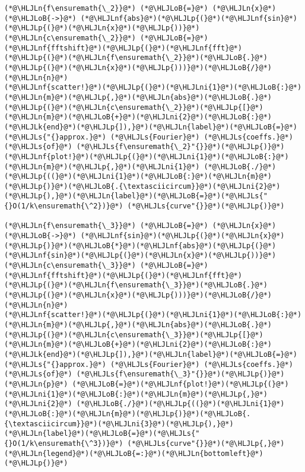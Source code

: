 \documentclass[12pt,a4paper]{article}
\newcommand{\HLJLk}[1]{\textcolor[RGB]{148,91,176}{\textbf{#1}}}
\newcommand{\HLJLn}[1]{#1}
\newcommand{\HLJLnf}[1]{\textcolor[RGB]{66,102,213}{#1}}
\newcommand{\HLJLs}[1]{\textcolor[RGB]{201,61,57}{#1}}
\newcommand{\HLJLni}[1]{\textcolor[RGB]{59,151,46}{#1}}
\newcommand{\HLJLoB}[1]{\textcolor[RGB]{102,102,102}{\textbf{#1}}}
\newcommand{\HLJLp}[1]{#1}
\begin{document}
\begin{lstlisting}
(*@\HLJLn{f\ensuremath{\_2}}@*) (*@\HLJLoB{=}@*) (*@\HLJLn{x}@*) (*@\HLJLoB{->}@*) (*@\HLJLnf{abs}@*)(*@\HLJLp{(}@*)(*@\HLJLnf{sin}@*)(*@\HLJLp{(}@*)(*@\HLJLn{x}@*)(*@\HLJLp{))}@*)
(*@\HLJLn{c\ensuremath{\_2}}@*) (*@\HLJLoB{=}@*) (*@\HLJLnf{fftshift}@*)(*@\HLJLp{(}@*)(*@\HLJLnf{fft}@*)(*@\HLJLp{(}@*)(*@\HLJLn{f\ensuremath{\_2}}@*)(*@\HLJLoB{.}@*)(*@\HLJLp{(}@*)(*@\HLJLn{x}@*)(*@\HLJLp{)))}@*)(*@\HLJLoB{/}@*)(*@\HLJLn{n}@*)
(*@\HLJLnf{scatter!}@*)(*@\HLJLp{(}@*)(*@\HLJLni{1}@*)(*@\HLJLoB{:}@*)(*@\HLJLn{m}@*)(*@\HLJLp{,}@*)(*@\HLJLn{abs}@*)(*@\HLJLoB{.}@*)(*@\HLJLp{(}@*)(*@\HLJLn{c\ensuremath{\_2}}@*)(*@\HLJLp{[}@*)(*@\HLJLn{m}@*)(*@\HLJLoB{+}@*)(*@\HLJLni{2}@*)(*@\HLJLoB{:}@*)(*@\HLJLk{end}@*)(*@\HLJLp{]),}@*)(*@\HLJLn{label}@*)(*@\HLJLoB{=}@*)(*@\HLJLs{"{}approx.}@*) (*@\HLJLs{Fourier}@*) (*@\HLJLs{coeffs.}@*) (*@\HLJLs{of}@*) (*@\HLJLs{f\ensuremath{\_2}"{}}@*)(*@\HLJLp{)}@*)
(*@\HLJLnf{plot!}@*)(*@\HLJLp{(}@*)(*@\HLJLni{1}@*)(*@\HLJLoB{:}@*)(*@\HLJLn{m}@*)(*@\HLJLp{,}@*)(*@\HLJLni{1}@*) (*@\HLJLoB{./}@*)(*@\HLJLp{((}@*)(*@\HLJLni{1}@*)(*@\HLJLoB{:}@*)(*@\HLJLn{m}@*)(*@\HLJLp{)}@*)(*@\HLJLoB{.{\textasciicircum}}@*)(*@\HLJLni{2}@*)(*@\HLJLp{),}@*)(*@\HLJLn{label}@*)(*@\HLJLoB{=}@*)(*@\HLJLs{"{}O(1/k\ensuremath{\^2})}@*) (*@\HLJLs{curve"{}}@*)(*@\HLJLp{)}@*)

(*@\HLJLn{f\ensuremath{\_3}}@*) (*@\HLJLoB{=}@*) (*@\HLJLn{x}@*) (*@\HLJLoB{->}@*) (*@\HLJLnf{sin}@*)(*@\HLJLp{(}@*)(*@\HLJLn{x}@*)(*@\HLJLp{)}@*)(*@\HLJLoB{*}@*)(*@\HLJLnf{abs}@*)(*@\HLJLp{(}@*)(*@\HLJLnf{sin}@*)(*@\HLJLp{(}@*)(*@\HLJLn{x}@*)(*@\HLJLp{))}@*)
(*@\HLJLn{c\ensuremath{\_3}}@*) (*@\HLJLoB{=}@*) (*@\HLJLnf{fftshift}@*)(*@\HLJLp{(}@*)(*@\HLJLnf{fft}@*)(*@\HLJLp{(}@*)(*@\HLJLn{f\ensuremath{\_3}}@*)(*@\HLJLoB{.}@*)(*@\HLJLp{(}@*)(*@\HLJLn{x}@*)(*@\HLJLp{)))}@*)(*@\HLJLoB{/}@*)(*@\HLJLn{n}@*)
(*@\HLJLnf{scatter!}@*)(*@\HLJLp{(}@*)(*@\HLJLni{1}@*)(*@\HLJLoB{:}@*)(*@\HLJLn{m}@*)(*@\HLJLp{,}@*)(*@\HLJLn{abs}@*)(*@\HLJLoB{.}@*)(*@\HLJLp{(}@*)(*@\HLJLn{c\ensuremath{\_3}}@*)(*@\HLJLp{[}@*)(*@\HLJLn{m}@*)(*@\HLJLoB{+}@*)(*@\HLJLni{2}@*)(*@\HLJLoB{:}@*)(*@\HLJLk{end}@*)(*@\HLJLp{]),}@*)(*@\HLJLn{label}@*)(*@\HLJLoB{=}@*)(*@\HLJLs{"{}approx.}@*) (*@\HLJLs{Fourier}@*) (*@\HLJLs{coeffs.}@*) (*@\HLJLs{of}@*) (*@\HLJLs{f\ensuremath{\_3}"{}}@*)(*@\HLJLp{)}@*)
(*@\HLJLn{p}@*) (*@\HLJLoB{=}@*)(*@\HLJLnf{plot!}@*)(*@\HLJLp{(}@*)(*@\HLJLni{1}@*)(*@\HLJLoB{:}@*)(*@\HLJLn{m}@*)(*@\HLJLp{,}@*)(*@\HLJLni{2}@*) (*@\HLJLoB{./}@*)(*@\HLJLp{((}@*)(*@\HLJLni{1}@*)(*@\HLJLoB{:}@*)(*@\HLJLn{m}@*)(*@\HLJLp{)}@*)(*@\HLJLoB{.{\textasciicircum}}@*)(*@\HLJLni{3}@*)(*@\HLJLp{),}@*)(*@\HLJLn{label}@*)(*@\HLJLoB{=}@*)(*@\HLJLs{"{}O(1/k\ensuremath{\^3})}@*) (*@\HLJLs{curve"{}}@*)(*@\HLJLp{,}@*)(*@\HLJLn{legend}@*)(*@\HLJLoB{=:}@*)(*@\HLJLn{bottomleft}@*)(*@\HLJLp{)}@*)
\end{lstlisting}
\end{document}
